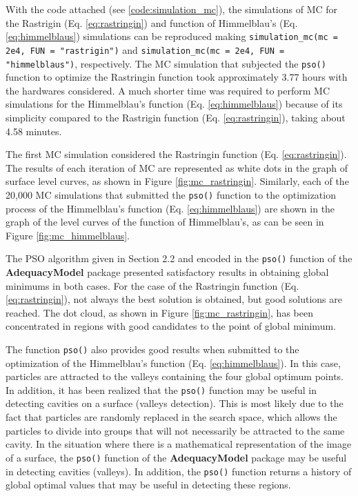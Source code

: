 \documentclass[10pt,letterpaper]{article}
\begin{document}
With the code attached (see \ref{code:simulation_mc}), the simulations of MC for the Rastrigin (Eq. \ref{eq:rastringin}) and function of Himmelblau's (Eq. \ref{eq:himmelblaus}) simulations can be reproduced making \texttt{simulation\_mc(mc = 2e4, FUN = "rastrigin")} and \texttt{simulation\_mc(mc = 2e4, FUN = "himmelblaus")}, respectively. The MC simulation that subjected the \texttt{pso()} function to optimize the Rastringin function took approximately 3.77 hours with the hardwares considered. A much shorter time was required to perform MC simulations for the Himmelblau's function (Eq. \ref{eq:himmelblaus}) because of its simplicity compared to the Rastrigin function (Eq. \ref{eq:rastringin}), taking about 4.58 minutes.

The first MC simulation considered the Rastringin function (Eq. \ref{eq:rastringin}). The results of each iteration of MC are represented as white dots in the graph of surface level curves, as shown in Figure \ref{fig:mc_rastringin}. Similarly, each of the 20,000 MC simulations that submitted the \texttt{pso()} function to the optimization process of the Himmelblau's function (Eq. \ref{eq:himmelblaus}) are shown in the graph of the level curves of the function of Himmelblau's, as can be seen in Figure \ref{fig:mc_himmelblaus}.

The PSO algorithm given in Section 2.2 and encoded in the \texttt{pso()} function of the \textbf{AdequacyModel} package presented satisfactory results in obtaining global minimums in both cases. For the case of the Rastringin function (Eq. \ref{eq:rastringin}), not always the best solution is obtained, but good solutions are reached. The dot cloud, as shown in Figure \ref{fig:mc_rastringin}, has been concentrated in regions with good candidates to the point of global minimum.

The function \texttt{pso()} also provides good results when submitted to the optimization of the Himmelblau's function (Eq. \ref{eq:himmelblaus}). In this case, particles are attracted to the valleys containing the four global optimum points. In addition, it has been realized that the \texttt{pso()} function may be useful in detecting cavities on a surface (valleys detection). This is most likely due to the fact that particles are randomly replaced in the search space, which allows the particles to divide into groups that will not necessarily be attracted to the same cavity. In the situation where there is a mathematical representation of the image of a surface, the \texttt{pso()} function of the \textbf{AdequacyModel} package may be useful in detecting cavities (valleys). In addition, the \texttt{pso()} function returns a history of global optimal values that may be useful in detecting these regions.
\end{document}
